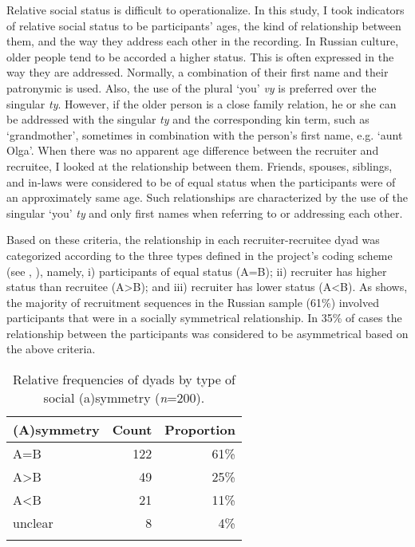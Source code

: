 \documentclass[output=paper,modfonts,nonflat]{langsci/langscibook}
\begin{document}
Relative social status is difficult to operationalize. In this study, I took indicators of relative social status to be participants’ ages, the kind of relationship between them, and the way they address each other in the recording. In Russian culture, older people tend to be accorded a higher status. This is often expressed in the way they are addressed. Normally, a combination of their first name and their patronymic is used. Also, the use of the plural ‘you’ \textit{vy} is preferred over the singular \textit{ty}. However, if the older person is a close family relation, he or she can be addressed with the singular \textit{ty} and the corresponding kin term, such as ‘grandmother’, sometimes in combination with the person’s first name, e.g. ‘aunt Olga’. When there was no apparent age difference between the recruiter and recruitee, I looked at the relationship between them. Friends, spouses, siblings, and in-laws were considered to be of equal status when the participants were of an approximately same age. Such relationships are characterized by the use of the singular ‘you’ \textit{ty} and only first names when referring to or addressing each other.

Based on these criteria, the relationship in each recruiter-recruitee dyad was categorized according to the three types defined in the project's coding scheme (see , ), namely, i) participants of equal status (A=B); ii) recruiter has higher status than recruitee (A>B); and iii) recruiter has lower status (A<B). As  shows, the majority of recruitment sequences in the Russian sample (61\%) involved participants that were in a socially symmetrical relationship. In 35\% of cases the relationship between the participants was considered to be asymmetrical based on the above criteria.

\begin{table}
\begin{tabularx}{.5\textwidth}{Xrr}
\lsptoprule
(A)symmetry & Count & Proportion\\
\midrule
A=B & 122 & 61\%\\
A>B & 49 & 25\%\\
A<B & 21 & 11\%\\
unclear & 8 & 4\%\\
\lspbottomrule
\end{tabularx}
\caption{Relative frequencies of dyads by type of social (a)symmetry (\textit{n}=200).}
\label{tab:baranova:5}
\end{table}
\end{document}
